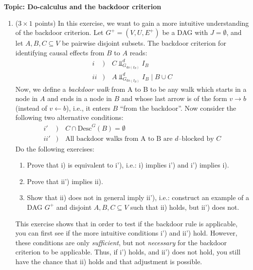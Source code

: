 

\flushleft\textbf{Topic: Do-calculus and the backdoor criterion}

\begin{enumerate}
\item ($3 \times 1$ points) In this exercise, we want to gain a more intuitive understanding of the backdoor criterion. 
Let $G^{+} = (V, U, E^{+})$ be a DAG with $J = \emptyset$, and let $A, B, C \subseteq V$ be pairwise disjoint subsets. 
The backdoor criterion for identifying causal effects from $B$ to $A$ reads:
\begin{align*}
  i & )  \quad   C    \Perp^d_{G_{\text{do}(I_B)}} I_B   \\
  ii & )  \quad    A    \Perp^d_{G_{\text{do}(I_B)}} I_B \mid B \cup C
\end{align*}
Now, we define a \emph{backdoor walk} from A to B to be any walk which starts in a node in $A$ and ends in a node in $B$ and whose last arrow is of the form $v \rightarrow b$ (instead of $v \leftarrow b$), i.e., it enters $B$ ``from the backdoor''.
Now consider the following two alternative conditions:
\begin{align*}
  i' & ) \quad   C \cap \text{Desc}^G(B) = \emptyset \\
  ii' & ) \quad   \text{All backdoor walks from A to B are $d$--blocked by $C$} 
\end{align*}
Do the following exercises:
\begin{enumerate}
  \item Prove that i) is equivalent to i'), i.e.: i) implies i') and i') implies i).
  \item Prove that ii') implies ii).
  \item Show that ii) does not in general imply ii'), i.e.: construct an example of a DAG $G^+$ and disjoint $A, B, C \subseteq V$ such that ii) holds, but ii') does not.
\end{enumerate}
This exercise shows that in order to test if the backdoor rule is applicable, you can first see if the more intuitive conditions i') and ii') hold.
However, these conditions are only \emph{sufficient}, but not \emph{necessary} for the backdoor criterion to be applicable.
Thus, if i') holds, and ii') does not hold, you still have the chance that ii) holds and that adjustment is possible.



\end{enumerate}
